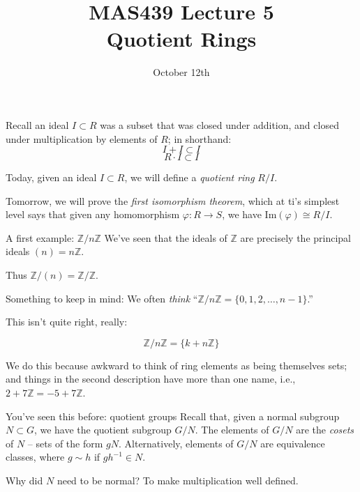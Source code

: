 \documentclass{beamer}
\title{MAS439 Lecture 5 \\ Quotient Rings}
\date{October 12th}
\begin{document}
\begin{frame}
\titlepage
\end{frame}


\begin{frame}{}

Recall an ideal $I\subset R$ was a subset that was closed under addition, and closed under multiplication by elements of $R$; in shorthand:
$$I+I\subset I$$
$$R\cdot I\subset I$$

Today, given an ideal $I\subset R$, we will define a \emph{quotient ring} $R/I$.

Tomorrow, we will prove the \emph{first isomorphism theorem}, which at ti's simplest level says that given any homomorphism $\varphi:R\to S$, we have $\textrm{Im}(\varphi)\cong R/I$.

\end{frame}

\begin{frame}{A first example: $\mathbb{Z}/n\mathbb{Z}$}
We've seen that the ideals of $\mathbb{Z}$ are precisely the principal ideals $(n)=n\mathbb{Z}$.

Thus $\mathbb{Z}/(n)=\mathbb{Z}/\mathbb{Z}$.

\begin{block}{Something to keep in mind:}
We often \emph{think} ``$\mathbb{Z}/n\mathbb{Z}=\{0,1,2,\dots, n-1\}$.''

This isn't quite right, really:

$$\mathbb{Z}/n\mathbb{Z}=\{k+n\mathbb{Z} \}$$

We do this because awkward to think of ring elements as being themselves sets; and things in the second description have more than one name, i.e., $2+7\mathbb{Z}=-5+7\mathbb{Z}$.

\end{block}


\end{frame}


\begin{frame}{You've seen this before: quotient groups}
Recall that, given a normal subgroup $N \subset  G$, we have the quotient subgroup $G/N$.  The elements of $G/N$ are the \emph{cosets} of $N$ -- sets of the form $gN$.  Alternatively, elements of $G/N$ are equivalence classes, where $g\sim h$ if $gh^{-1}\in N$.

\begin{block}{Why did $N$ need to be normal?}
To make multiplication well defined.

\end{block}

\end{frame}
\end{document}
